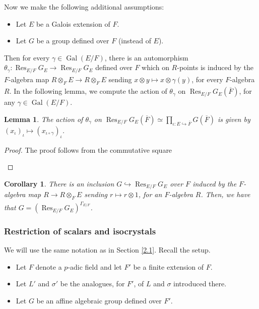 \documentclass[11pt,a4paper]{article}
\theoremstyle{definition}
\theoremstyle{plain}
\newtheorem{Le}[shared]{Lemma}
\newtheorem{C}[shared]{Corollary}
\theoremstyle{remark}
\theoremstyle{plain}
\DeclareMathOperator{\Gal}{Gal}
\DeclareMathOperator{\Res}{Res}
\begin{document}
Now we make the following additional assumptions:
\begin{itemize}
    \item Let $E$ be a Galois extension of $F$.
    \item Let $G$ be a group defined over $F$ (instead of $E$).
\end{itemize}
Then for every $\gamma \in \Gal(E/F)$, there is an automorphism $\theta_{\gamma}: \Res_{E/F}G_E \xrightarrow[]{} \Res_{E/F}G_E$ defined over $F$ which on $R$-points is induced by the $F$-algebra map $R \otimes_F E \xrightarrow[]{} R \otimes_F E$ sending $x \otimes y \mapsto x \otimes \gamma(y)$, for every $F$-algebra $R$. In the following lemma, we compute the action of $\theta_{\gamma}$ on $\Res_{E/F}G_E(\overline{F})$, for any $\gamma \in \Gal(E/F)$.

\begin{Le}
    The action of $\theta_{\gamma}$ on $\Res_{E/F}G_E(\overline{F}) \simeq \prod_{\iota: E \hookrightarrow \overline{F}} G(\overline{F})$ is given by $(x_{\iota})_{\iota} \mapsto (x_{\iota \circ \gamma})_{\iota}$.
\end{Le}
\begin{proof}
    The proof follows from the commutative square
\begin{center}
\quad
{}
\end{center}
\end{proof}

\begin{C}\label{twistedcor2}
    There is an inclusion $G \hookrightarrow \Res_{E/F}G_E$ over $F$ induced by the $F$-algebra map $R \xrightarrow[]{} R \otimes_F E$ sending $r \mapsto r \otimes 1$, for an $F$-algebra $R$. Then, we have that $G = (\Res_{E/F}G_E)^{\Gamma_{E/F}}$.
\end{C}

\subsubsection{Restriction of scalars and isocrystals}
We will use the same notation as in Section \ref{2.1}. Recall the setup.
\begin{itemize}
    \item Let $F$ denote a $p$-adic field and let $F'$ be a finite extension of $F$.
    \item Let $L'$ and $\sigma'$ be the analogues, for $F'$, of $L$ and $\sigma$ introduced there.
    \item Let $G$ be an affine algebraic group defined over $F'$.
\end{itemize}
\end{document}
